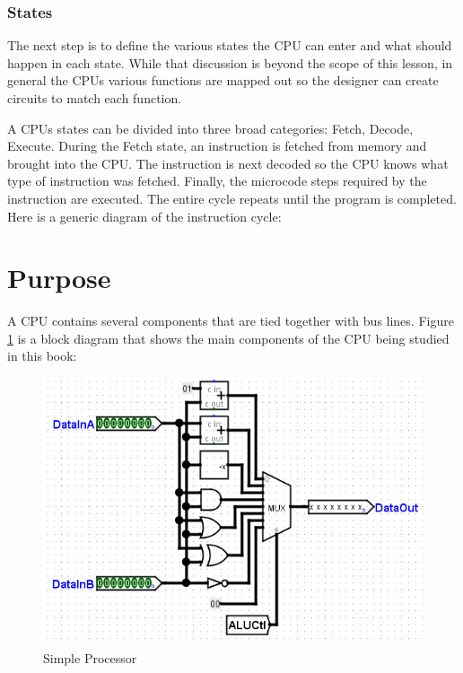 \subsubsection{States}

The next step is to define the various states the \ac{CPU} can enter and what should happen in each state. While that discussion is beyond the scope of this lesson, in general the \acp{CPU} various functions are mapped out so the designer can create circuits to match each function.

A \acp{CPU} states can be divided into three broad categories: Fetch, Decode, Execute. During the Fetch state, an instruction is fetched from memory and brought into the \ac{CPU}. The instruction is next decoded so the \ac{CPU} knows what type of instruction was fetched. Finally, the microcode steps required by the instruction are executed. The entire cycle repeats until the program is completed. Here is a generic diagram of the instruction cycle:

\bigskip


\section{Purpose}


A \ac{CPU} contains several components that are tied together with bus lines. Figure \ref{fig:11-01} is a block diagram that shows the main components of the \ac{CPU} being studied in this book: 

\begin{figure}[H]
	\centering
	\includegraphics[width=\maxwidth{.95\linewidth}]{gfx/11-01}
	\caption{Simple Processor}
	\label{fig:11-01}
\end{figure}

